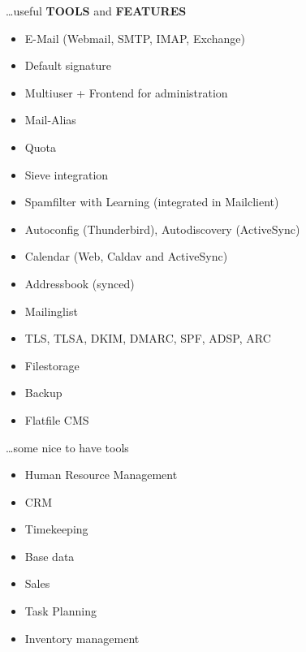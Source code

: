 \documentclass{beamer}
\begin{document}
	\begin{frame}{\insertsection}{\insertsubsection}
		\vspace{-0.5cm}
		
		\dots useful \textbf{TOOLS} and \textbf{FEATURES}
		
		\begin{itemize}
			\item E-Mail (Webmail, SMTP, IMAP, Exchange)
			\item Default signature
			\item Multiuser + Frontend for administration
			\item Mail-Alias
			\item Quota
			\item Sieve integration
			\item Spamfilter with Learning (integrated in Mailclient) 
			\item Autoconfig (Thunderbird), Autodiscovery (ActiveSync)
			\item Calendar (Web, Caldav and ActiveSync)
			\item Addressbook (synced)
			\item Mailinglist
			\item TLS, TLSA, DKIM, DMARC, SPF, ADSP, ARC
			\item Filestorage
			\item Backup
			\item Flatfile CMS
		\end{itemize}

	\end{frame}

	\begin{frame}{\insertsection}{\insertsubsection}
		\vspace{-0.5cm}
		
		\dots some nice to have tools
		
		\begin{itemize}
			\item Human Resource Management
			\item CRM
			\item Timekeeping
			\item Base data
			\item Sales
			\item Task Planning
			\item Inventory management
		\end{itemize}
		
	\end{frame}
\end{document}
